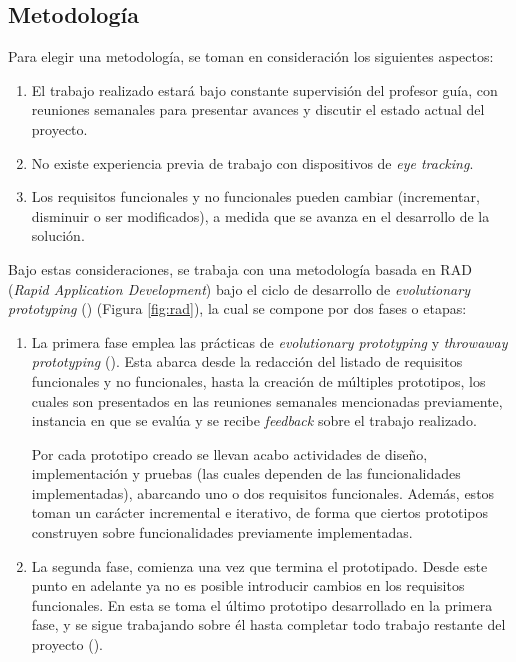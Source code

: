 \subsection{Metodolog\'ia}
Para elegir una metodología, se toman en consideración los siguientes aspectos:
\begin{enumerate}
    \item El trabajo realizado estará bajo constante supervisión del profesor guía, con reuniones semanales para presentar avances y discutir el estado actual del proyecto.
    \item No existe experiencia previa de trabajo con dispositivos de \textit{eye tracking}.
    \item Los requisitos funcionales y no funcionales pueden cambiar (incrementar, disminuir o ser modificados), a medida que se avanza en el desarrollo de la solución.
\end{enumerate}

Bajo estas consideraciones, se trabaja con una metodología basada en RAD (\textit{Rapid Application Development}) bajo el ciclo de desarrollo de \textit{evolutionary prototyping} (\cite{mcconnell_96}) (Figura \ref{fig:rad}), la cual se compone por dos fases o etapas:

\begin{enumerate}
    \item La primera fase emplea las prácticas de \textit{evolutionary prototyping} y \textit{throwaway prototyping} (\cite{mcconnell_96}). Esta abarca desde la redacción del listado de requisitos funcionales y no funcionales, hasta la creación de múltiples prototipos, los cuales son presentados en las reuniones semanales mencionadas previamente, instancia en que se evalúa y se recibe \textit{feedback} sobre el trabajo realizado.

    Por cada prototipo creado se llevan acabo actividades de diseño, implementación y pruebas (las cuales dependen de las funcionalidades implementadas), abarcando uno o dos requisitos funcionales. Además, estos toman un carácter incremental e iterativo, de forma que ciertos prototipos construyen sobre funcionalidades previamente implementadas.
    
    \item La segunda fase, comienza una vez que termina el prototipado. Desde este punto en adelante ya no es posible introducir cambios en los requisitos funcionales. En esta se toma el último prototipo desarrollado en la primera fase, y se sigue trabajando sobre él hasta completar todo trabajo restante del proyecto (\cite{mcconnell_96}).
\end{enumerate}

